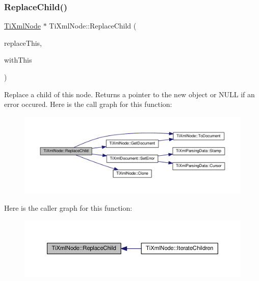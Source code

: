 \subsubsection{\texorpdfstring{Replace\+Child()}{ReplaceChild()}}
{\footnotesize\ttfamily \hyperlink{class_ti_xml_node}{Ti\+Xml\+Node} $\ast$ Ti\+Xml\+Node\+::\+Replace\+Child (\begin{DoxyParamCaption}\item[{\hyperlink{class_ti_xml_node}{Ti\+Xml\+Node} $\ast$}]{replace\+This,  }\item[{const \hyperlink{class_ti_xml_node}{Ti\+Xml\+Node} \&}]{with\+This }\end{DoxyParamCaption})}

Replace a child of this node. Returns a pointer to the new object or N\+U\+LL if an error occured. Here is the call graph for this function\+:
\nopagebreak
\begin{figure}[H]
\begin{center}
\leavevmode
\includegraphics[width=350pt]{class_ti_xml_node_a543208c2c801c84a213529541e904b9f_cgraph}
\end{center}
\end{figure}
Here is the caller graph for this function\+:
\nopagebreak
\begin{figure}[H]
\begin{center}
\leavevmode
\includegraphics[width=350pt]{class_ti_xml_node_a543208c2c801c84a213529541e904b9f_icgraph}
\end{center}
\end{figure}
\mbox{\label{class_ti_xml_node_a2a38329ca5d3f28f98ce932b8299ae90}} 

